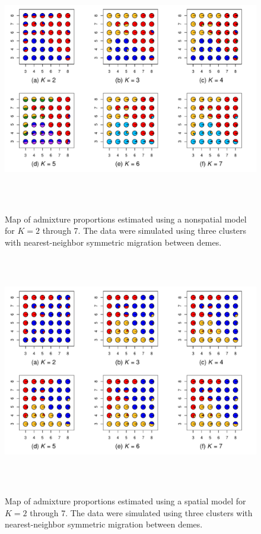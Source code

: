 \documentclass[12pt]{article}
\begin{document}
\begin{figure}
	\centering
		{\includegraphics[width=6in,height=4in]{figs/sims/simK3_nsp_pies.pdf}}
	\caption{
	Map of admixture proportions estimated using a nonspatial model for $K=2$ through 7.
	The data were simulated using three clusters with nearest-neighbor symmetric migration between demes.
    }\label{simK3_nsp_pies}
\end{figure}

\begin{figure}
	\centering
		{\includegraphics[width=6in,height=4in]{figs/sims/simK3_sp_pies.pdf}}
	\caption{
	Map of admixture proportions estimated using a spatial model for $K=2$ through 7.
	The data were simulated using three clusters with nearest-neighbor symmetric migration between demes.
    }\label{simK3_sp_pies}
\end{figure}
\clearpage
\end{document}
